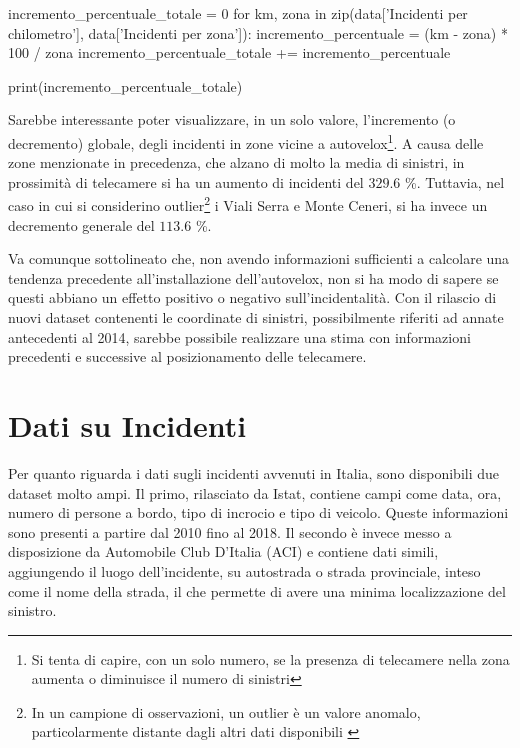 \documentclass[a4paper,12pt]{report}
\begin{document}
\begin{code}
incremento_percentuale_totale = 0
for km, zona in zip(data['Incidenti per chilometro'], data['Incidenti per zona']): 
    incremento_percentuale = (km - zona) * 100 / zona
    incremento_percentuale_totale += incremento_percentuale

print(incremento_percentuale_totale)
\end{code}

Sarebbe interessante poter visualizzare, in un solo valore, l'incremento (o decremento) 
globale, degli incidenti in zone vicine a 
autovelox\footnote{Si tenta di capire, con un solo numero, se la presenza di 
telecamere nella zona aumenta o diminuisce il numero di sinistri}. 
A causa delle zone menzionate in precedenza, che alzano di molto la media di sinistri, 
in prossimità di telecamere si ha un aumento di 
incidenti del $329.6$ \%. 
Tuttavia, nel caso in cui si considerino 
outlier\footnote{In un campione di osservazioni, un outlier è un valore anomalo, 
particolarmente distante dagli altri dati disponibili \cite{PROB_E_STATISTICA:1}} 
i Viali Serra e Monte Ceneri, si ha invece un decremento generale del $113.6$ \%. 

Va comunque sottolineato che, non avendo informazioni sufficienti a calcolare una tendenza 
precedente all'installazione dell'autovelox, non si ha modo di sapere se questi abbiano un 
effetto positivo o negativo sull'incidentalità. 
Con il rilascio di nuovi dataset contenenti le coordinate di sinistri, 
possibilmente riferiti ad annate antecedenti al 2014, sarebbe possibile realizzare 
una stima con informazioni precedenti e 
successive al posizionamento delle telecamere. 

\chapter{Dati su Incidenti}

Per quanto riguarda i dati sugli incidenti avvenuti in Italia, 
sono disponibili due dataset molto ampi. 
Il primo, rilasciato da Istat, contiene campi come data, ora, 
numero di persone a bordo, tipo di incrocio e tipo di veicolo. 
Queste informazioni sono presenti a partire dal 2010 fino al 2018. 
Il secondo è invece messo a disposizione da Automobile Club D'Italia (ACI) 
e contiene dati simili, 
aggiungendo il luogo dell'incidente, su autostrada o strada provinciale, 
inteso come il nome della strada, il che permette di avere una minima localizzazione del 
sinistro. 
\end{document}
